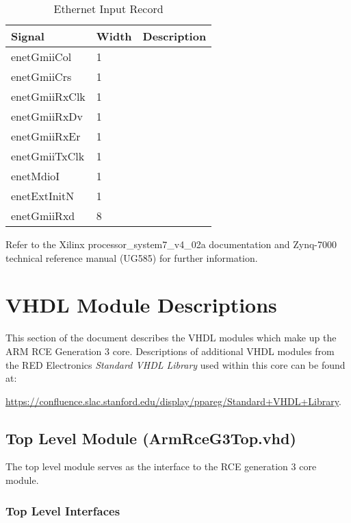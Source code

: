\documentclass[11pt]{article}
\begin{document}
\begin{table}[H]
\small
\centering
   \begin{tabular}{| l | l | l | }
      \hline \textbf{Signal} & \textbf{Width}  & \textbf{Description} \\
      \hline enetGmiiCol   & 1       &  \\
      \hline enetGmiiCrs   & 1       &  \\
      \hline enetGmiiRxClk & 1       &  \\
      \hline enetGmiiRxDv  & 1       &  \\
      \hline enetGmiiRxEr  & 1       &  \\
      \hline enetGmiiTxClk & 1       &  \\
      \hline enetMdioI     & 1       &  \\
      \hline enetExtInitN  & 1       &  \\
      \hline enetGmiiRxd   & 8       &  \\
      \hline
   \end{tabular}
   \caption{Ethernet Input Record}
\end{table}

Refer to the Xilinx processor\_system7\_v4\_02a documentation and Zynq-7000 technical reference manual (UG585) for further information.

\newpage
\section{VHDL Module Descriptions}
\label{sec:vhdl_modules}

This section of the document describes the VHDL modules which make up the ARM RCE Generation 3 core. Descriptions of additional VHDL modules from the RED Electronics \textit{Standard VHDL Library} used within this core can be found at:

\begin{center}
\url{https://confluence.slac.stanford.edu/display/ppareg/Standard+VHDL+Library}.
\end{center}

\subsection{Top Level Module (ArmRceG3Top.vhd)}
\label{subsec:ArmRceG3Top}

The top level module serves as the interface to the RCE generation 3 core module. 

\subsubsection{Top Level Interfaces}
\end{document}
